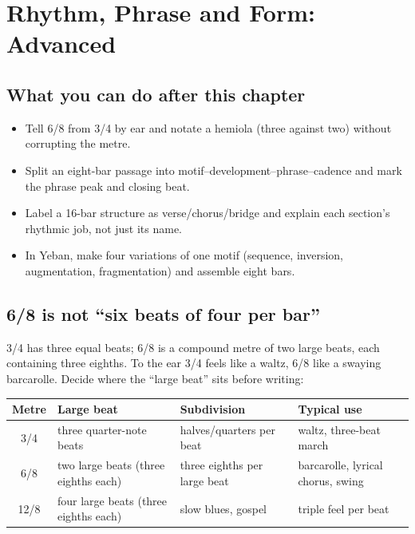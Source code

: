 \clearpage
\chapter{Rhythm, Phrase and Form: Advanced}
\label{chap:rhythm-phrase-form}


\section*{What you can do after this chapter}
\begin{itemize}
  \item Tell 6/8 from 3/4 by ear and notate a hemiola (three against two) without corrupting the metre.
  \item Split an eight-bar passage into motif--development--phrase--cadence and mark the phrase peak and closing beat.
  \item Label a 16-bar structure as verse/chorus/bridge and explain each section's rhythmic job, not just its name.
  \item In Yeban, make four variations of one motif (sequence, inversion, augmentation, fragmentation) and assemble eight bars.
\end{itemize}

\section{6/8 is not ``six beats of four per bar''}

3/4 has three equal beats; 6/8 is a compound metre of two large beats, each containing three eighths. To the ear 3/4 feels like a waltz, 6/8 like a swaying barcarolle. Decide where the ``large beat'' sits before writing:

\begin{center}
\small
\begin{tabular}{clll}
\toprule
Metre & Large beat & Subdivision & Typical use \\
\midrule
3/4 & three quarter-note beats & halves/quarters per beat & waltz, three-beat march \\
6/8 & two large beats (three eighths each) & three eighths per large beat & barcarolle, lyrical chorus, swing \\
12/8 & four large beats (three eighths each) & slow blues, gospel & triple feel per beat \\
\bottomrule
\end{tabular}
\end{center}

